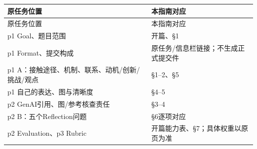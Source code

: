 \begingroup
\small\setlength{\tabcolsep}{3pt}
\renewcommand{\arraystretch}{1.22}
\begin{longtable}{@{}>{\raggedright\arraybackslash}p{}>{\raggedright\arraybackslash}p{}@{}}
\toprule
原任务位置 & 本指南对应 \\
\midrule\endfirsthead
原任务位置 & 本指南对应 \\
\midrule\endhead
\bottomrule\endfoot
p1 Goal、题目范围 & 开篇、§1 \\
p1 Format、提交构成 & 原任务/信息栏链接；不生成正式提交件 \\
p1 A：接触途径、机制、联系、动机/创新/挑战/观点 & §1–2、§5 \\
p1 自己的表达、图与清晰度 & §4–5 \\
p2 GenAI引用、图/参考核查责任 & §3–4 \\
p2 B：五个Reflection问题 & §6逐项对应 \\
p2 Evaluation、p3 Rubric & 开篇能力表、§7；具体权重以原页为准 \\
\end{longtable}
\endgroup
